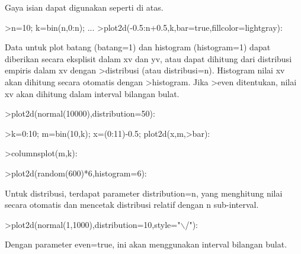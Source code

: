 \documentclass[a4paper,10pt]{article}
\begin{document}
\begin{eulernotebook}
\begin{eulercomment}
\begin{eulercomment}
\begin{eulercomment}
\begin{eulercomment}
\begin{eulercomment}
Gaya isian dapat digunakan seperti di atas.
\end{eulercomment}
\begin{eulerprompt}
>n=10; k=bin(n,0:n); ...
>plot2d(-0.5:n+0.5,k,bar=true,fillcolor=lightgray):
\end{eulerprompt}
\begin{eulercomment}
Data untuk plot batang (batang=1) dan histogram (histogram=1) dapat
diberikan secara eksplisit dalam xv dan yv, atau dapat dihitung dari
distribusi empiris dalam xv dengan \textgreater{}distribusi (atau distribusi=n).
Histogram nilai xv akan dihitung secara otomatis dengan \textgreater{}histogram.
Jika \textgreater{}even ditentukan, nilai xv akan dihitung dalam interval bilangan
bulat.
\end{eulercomment}
\begin{eulerprompt}
>plot2d(normal(10000),distribution=50):
\end{eulerprompt}
\begin{eulerprompt}
>k=0:10; m=bin(10,k); x=(0:11)-0.5; plot2d(x,m,>bar):
\end{eulerprompt}
\begin{eulerprompt}
>columnsplot(m,k):
\end{eulerprompt}
\begin{eulerprompt}
>plot2d(random(600)*6,histogram=6):
\end{eulerprompt}
\begin{eulercomment}
Untuk distribusi, terdapat parameter distribution=n, yang menghitung
nilai secara otomatis dan mencetak distribusi relatif dengan n
sub-interval.
\end{eulercomment}
\begin{eulerprompt}
>plot2d(normal(1,1000),distribution=10,style="\(\backslash\)/"):
\end{eulerprompt}
\begin{eulercomment}
Dengan parameter even=true, ini akan menggunakan interval bilangan
bulat.
\end{eulercomment}
\begin{eulerprompt}

\end{eulerprompt}
\end{eulercomment}
\end{eulercomment}
\end{eulercomment}
\end{eulercomment}
\end{eulernotebook}
\end{document}
